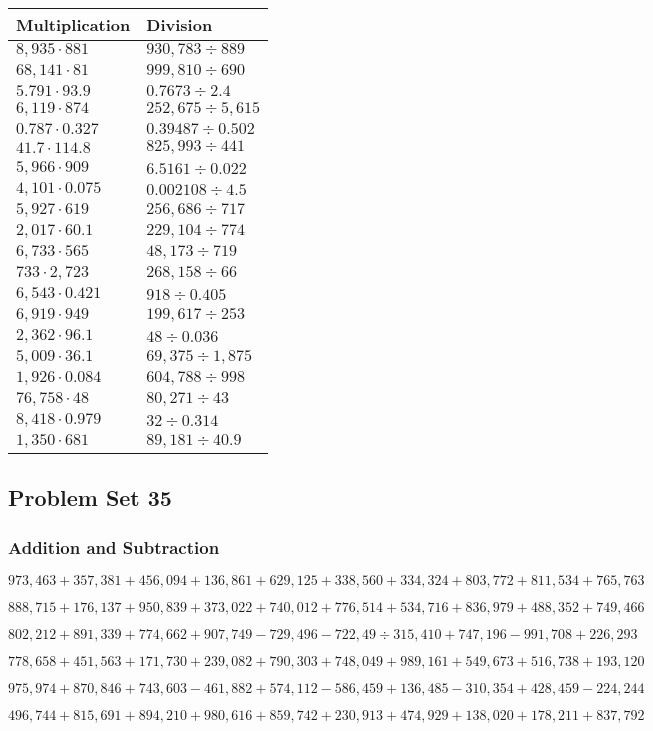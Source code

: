 \begin{longtable}[]{@{}ll@{}}
\toprule
Multiplication & Division\tabularnewline
\midrule
\endhead
\(8,935\cdot881\) & \(930,783÷889\)\tabularnewline
\(68,141\cdot81\) & \(999,810÷690\)\tabularnewline
\(5.791\cdot93.9\) & \(0.7673÷2.4\)\tabularnewline
\(6,119\cdot874\) & \(252,675÷5,615\)\tabularnewline
\(0.787\cdot0.327\) & \(0.39487÷0.502\)\tabularnewline
\(41.7\cdot114.8\) & \(825,993÷441\)\tabularnewline
\(5,966\cdot909\) & \(6.5161÷0.022\)\tabularnewline
\(4,101\cdot0.075\) & \(0.002108÷4.5\)\tabularnewline
\(5,927\cdot619\) & \(256,686÷717\)\tabularnewline
\(2,017\cdot60.1\) & \(229,104÷774\)\tabularnewline
\(6,733\cdot565\) & \(48,173÷719\)\tabularnewline
\(733\cdot2,723\) & \(268,158÷66\)\tabularnewline
\(6,543\cdot0.421\) & \(918÷0.405\)\tabularnewline
\(6,919\cdot949\) & \(199,617÷253\)\tabularnewline
\(2,362\cdot96.1\) & \(48÷0.036\)\tabularnewline
\(5,009\cdot36.1\) & \(69,375÷1,875\)\tabularnewline
\(1,926\cdot0.084\) & \(604,788÷998\)\tabularnewline
\(76,758\cdot48\) & \(80,271÷43\)\tabularnewline
\(8,418\cdot0.979\) & \(32÷0.314\)\tabularnewline
\(1,350\cdot681\) & \(89,181÷40.9\)\tabularnewline
\bottomrule
\end{longtable}

\hypertarget{problem-set-35-5}{%
\subsection{Problem Set 35}\label{problem-set-35-5}}

\hypertarget{addition-and-subtraction-340}{%
\subsubsection{Addition and
Subtraction}\label{addition-and-subtraction-340}}

\(973,463+357,381+456,094+136,861+629,125+338,560+334,324+803,772+811,534+ 765,763\)

\(888,715+176,137+950,839+373,022+740,012+776,514+534,716+836,979+488,352+749,466\)

\(802,212+891,339+774,662+907,749-729,496-722,49÷315,410+747,196-991,708+226,293\)

\(778,658+451,563+171,730+239,082+790,303+748,049+989,161+549,673+516,738+193,120\)

\(975,974+870,846+743,603-461,882+574,112-586,459+136,485-310,354+428,459-224,244\)

\(496,744+815,691+894,210+980,616+859,742+230,913+474,929+138,020+178,211+837,792\)

